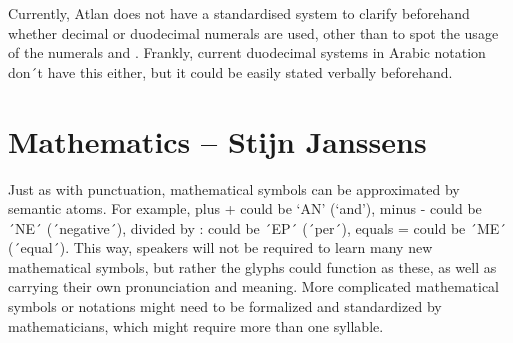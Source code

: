 Currently, Atlan does not have a standardised system to clarify beforehand whether decimal or duodecimal numerals are used, other than to spot the usage of the numerals  and . Frankly, current duodecimal systems in Arabic notation don´t have this either, but it could be easily stated verbally beforehand.  

 

\section{Mathematics -- {\small Stijn Janssens}}

Just as with punctuation, mathematical symbols can be approximated by semantic atoms. For example, plus + could be ‘AN’ \an (‘and’), minus - could be ´NE´ \ne (´negative´), divided by : could be ´EP´ \raisebox{-0.5em}{\ep} (´per´), equals = could be ´ME´ \raisebox{-0.3em}{\me} (´equal´). This way, speakers will not be required to learn many new mathematical symbols, but rather the glyphs could function as these, as well as carrying their own pronunciation and meaning. More complicated mathematical symbols or notations might need to be formalized and standardized by mathematicians, which might require more than one syllable. 









